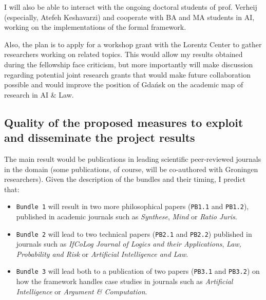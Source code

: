 \documentclass[11pt, a4paper]{article}
\begin{document}
I will also be able to interact with the  ongoing doctoral students of prof. Verheij (especially, Atefeh Keshavarzi) and cooperate with BA and MA students in AI, working on the implementations of the formal framework. 

Also, the plan is to apply for a workshop grant with the Lorentz Center to gather researchers working on related topics. This would allow my results obtained during the fellowship face criticism, but more importantly will make discussion regarding potential joint research grants that would make future collaboration possible and would improve the position of  Gda\'nsk on the academic map of research in AI \& Law. 




\vspace{-5mm}

\subsection{Quality of the proposed measures to exploit and disseminate the project results}\label{sec:papers}


\vspace{-2mm}

The main result would be publications in leading scientific peer-reviewed journals in the domain (some publications, of course, will be co-authored with Groningen researchers). Given the description of the bundles and their timing, I predict that:

\vspace{-4mm}

\begin{itemize}\setlength\itemsep{-1.5mm}
\item \verb|Bundle 1| will result in  two more philosophical papers (\verb|PB1.1| and \verb|PB1.2|), published in  academic journals such as \emph{Synthese}, \emph{Mind} or \emph{Ratio Juris}. 

\item \verb|Bundle 2| will lead to two   technical papers (\verb|PB2.1| and \verb|PB2.2|)  published in journals such as \emph{IfCoLog Journal of Logics and their Applications}, \emph{Law, Probability and Risk} or \emph{Artificial Intelligence and Law}.

\item \verb|Bundle 3|  will lead both to a publication of two papers (\verb|PB3.1| and \verb|PB3.2|) on  how the framework handles case studies in  journals such as \emph{Artificial Intelligence} or \emph{Argument \& Computation}.
\end{itemize}
\end{document}
